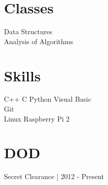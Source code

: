 \documentclass[]{deedy-resume-openfont}
\begin{document}
\begin{minipage}[t]{0.33\textwidth}

\section{Classes}
Data Structures \\
Analysis of Algorithms \\
\sectionsep


\section{Skills}
C++ \textbullet{} C \textbullet{} Python \textbullet{} Visual Basic \\[3pt]
Git \\[3pt]
Linux \textbullet{} Raspberry Pi 2 \\[3pt]
\sectionsep


\section{DOD}
Secret Clearance | 2012 - Present
\sectionsep

%
%

\end{minipage} 
\hfill
\end{document}
